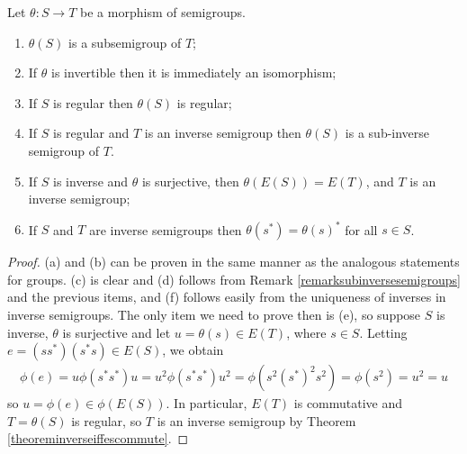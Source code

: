 \begin{proposition}\label{propositionpropertiesofmorphismsofsemigroups}
Let $\theta:S\to T$ be a morphism of semigroups.
\begin{enumerate}
\item[(a)] $\theta(S)$ is a subsemigroup of $T$;
\item[(b)] If $\theta$ is invertible then it is immediately an isomorphism;
\item[(c)] If $S$ is regular then $\theta(S)$ is regular;
\item[(d)] If $S$ is regular and $T$ is an inverse semigroup then $\theta(S)$ is a sub-inverse semigroup of $T$.
\item[(e)] If $S$ is inverse and $\theta$ is surjective, then $\theta(E(S))=E(T)$, and $T$ is an inverse semigroup;
\item[(f)] If $S$ and $T$ are inverse semigroups then $\theta(s^*)=\theta(s)^*$ for all $s\in S$.
\end{enumerate}
\end{proposition}
\begin{proof}
(a) and (b) can be proven in the same manner as the analogous statements for groups. (c) is clear and (d) follows from Remark \ref{remarksubinversesemigroups} and the previous items, and (f) follows easily from the uniqueness of inverses in inverse semigroups. The only item we need to prove then is (e), so suppose $S$ is inverse, $\theta$ is surjective and let $u=\theta(s)\in E(T)$, where $s\in S$. Letting $e=(ss^*)(s^*s)\in E(S)$, we obtain
\begin{align*}
\phi(e)=u\phi(s^*s^*)u=u^2\phi(s^*s^*)u^2=\phi(s^2(s^*)^2s^2)=\phi(s^2)=u^2=u
\end{align*}
so $u=\phi(e)\in\phi(E(S))$. In particular, $E(T)$ is commutative and $T=\theta(S)$ is regular, so $T$ is an inverse semigroup by Theorem \ref{theoreminverseiffescommute}.\qedhere
\end{proof}

